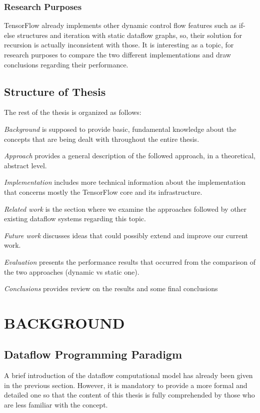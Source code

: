 \documentclass[ack,preface]{dithesis}
\begin{document}
    \subsection{Research Purposes}
	TensorFlow already implements other dynamic control flow features such as if-else structures and iteration with static dataflow graphs, so, their solution for recursion is actually inconsistent with those. It is interesting as a topic, for research purposes to compare the two different implementations and draw conclusions regarding their performance. 

    \section{Structure of Thesis}
The rest of the thesis is organized as follows:

\textit{Background} is supposed to provide basic, fundamental knowledge about the concepts that are being dealt with throughout the entire thesis.

\textit{Approach} provides a general description of the followed approach, in a theoretical, abstract level.

\textit{Implementation} includes more technical information about the implementation that concerns mostly the TensorFlow core and its infrastructure.

\textit{Related work} is the section where we examine the approaches followed by other existing dataflow systems regarding this topic.

\textit{Future work} discusses ideas that could possibly extend and improve our current work.

\textit{Evaluation} presents the performance results that occurred from the comparison of the two approaches (dynamic vs static one).

\textit{Conclusions} provides review on the results and some final conclusions


\chapter{BACKGROUND}
    \section{Dataflow Programming Paradigm}
A brief introduction of the dataflow computational model has already been given in the previous section. However, it is mandatory to provide a more formal and detailed one so that the content of this thesis is fully comprehended by those who are less familiar with the concept.
\end{document}
